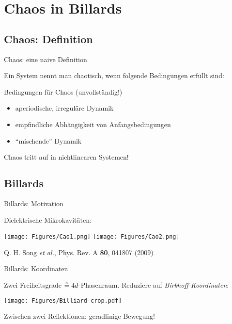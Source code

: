 \section{Chaos in Billards}
\subsection{Chaos: Definition}

\begin{frame}{Chaos: eine naive Definition}

  Ein System nennt man chaotisch, wenn folgende Bedingungen erfüllt sind:

  \begin{alertbbox}{Bedingungen für Chaos (unvollständig!)}
    \begin{itemize}
    \item aperiodische, irreguläre Dynamik
    \item empfindliche Abhängigkeit von Anfangsbedingungen
    \item ``mischende'' Dynamik
    \end{itemize}

  \end{alertbbox}

  Chaos tritt auf in \alert{nichtlinearen} Systemen!
\end{frame}


\subsection{Billards}
\begin{frame}{Billards: Motivation}

  Dielektrische Mikrokavitäten:

  \begin{center}
    \texttt{[image: Figures/Cao1.png]}
    \texttt{[image: Figures/Cao2.png]}
  \end{center}

  {\footnotesize{Q. H. Song \emph{et al.}, Phys. Rev. A {\bf 80}, 041807 (2009)}}

\end{frame}


\begin{frame}{Billards: Koordinaten}

  Zwei Freiheitsgrade $\stackrel{\scriptscriptstyle\wedge}{=} 4d$-Phasenraum. Reduziere auf \emph{Birkhoff-Koordinaten}:

  \begin{center}
    \texttt{[image: Figures/Billiard-crop.pdf]}
  \end{center}

  Zwischen zwei Reflektionen: geradlinige Bewegung!
\end{frame}


